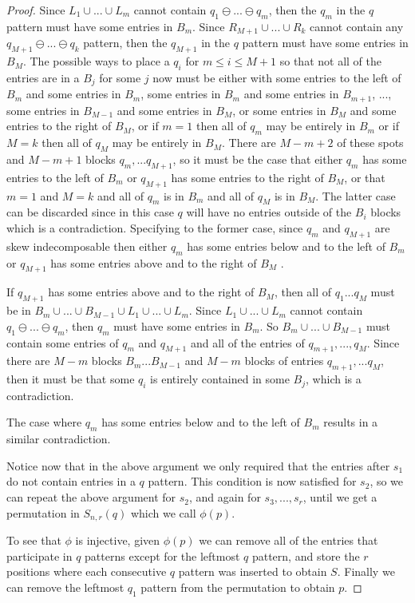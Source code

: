 \documentclass[10pt,a4paper]{amsart}
\begin{document}
\begin{proof}
    Since $L_1 \cup ... \cup L_m$ cannot contain $q_1 \ominus ... \ominus q_m$, then the $q_m$ in the $q$ pattern must have some entries in $B_m$. Since $R_{M+1} \cup ... \cup R_k$ cannot contain any $q_{M+1} \ominus ... \ominus q_k$ pattern, then the $q_{M+1}$ in the $q$ pattern must have some entries in $B_M$. The possible ways to place a $q_i$ for $m\leq i \leq M+1$ so that not all of the entries are in a $B_j$ for some $j$ now must be either with some entries to the left of $B_m$ and some entries in $B_m$, some entries in $B_m$ and some entries in $B_{m+1}$, ..., some entries in $B_{M-1}$ and some entries in $B_M$, or some entries in $B_M$ and some entries to the right of $B_M$, or if $m = 1$ then all of $q_m$ may be entirely in $B_m$ or if $M = k$ then all of $q_M$ may be entirely in $B_M$. There are $M-m + 2$ of these spots and $M-m + 1$ blocks $q_m, ... q_{M+1}$, so it must be the case that either $q_m$ has some entries to the left of $B_m$ or $q_{M+1}$ has some entries to the right of $B_M$, or that $m=1$ and $M=k$ and all of $q_m$ is in $B_m$ and all of $q_M$ is in $B_M$. The latter case can be discarded since in this case $q$ will have no entries outside of the $B_i$ blocks which is a contradiction. Specifying to the former case, since $q_m$ and $q_{M+1}$ are skew indecomposable then either $q_m$ has some entries below and to the left of $B_m$ or $q_{M+1}$ has some entries above and to the right of $B_M$ .
    
    If $q_{M+1}$ has some entries above and to the right of $B_M$, then all of $q_1 ... q_M$ must be in $B_m \cup ... \cup B_{M-1} \cup L_1 \cup ...\cup L_m$. Since $L_1 \cup ...\cup  L_m$ cannot contain $q_1 \ominus ... \ominus q_m$, then $q_m$ must have some entries in $B_m$. So $B_m \cup ... \cup B_{M-1}$ must contain some entries of $q_m$ and $q_{M+1}$ and all of the entries of $q_{m+1}, ..., q_M$. Since there are $M-m$ blocks $B_m ... B_{M-1}$ and $M-m$ blocks of entries $q_{m+1}, ... q_M$, then it must be that some $q_i$ is entirely contained in some $B_j$, which is a contradiction.

    The case where $q_m$ has some entries below and to the left of $B_m$ results in a similar contradiction.
    

    
    Notice now that in the above argument we only required that the entries after $s_1$ do not contain entries in a $q$ pattern. This condition is now satisfied for $s_2$, so we can repeat the above argument for $s_2$, and again for $s_3, ..., s_{r}$, until we get a permutation in $S_{n,r}(q)$ which we call $\phi(p)$.

    To see that $\phi$ is injective, given $\phi(p)$ we can remove all of the entries that participate in $q$ patterns except for the leftmost $q$ pattern, and store the $r$ positions where each consecutive $q$ pattern was inserted to obtain $S$. Finally we can remove the leftmost $q_1$ pattern from the permutation to obtain $p$.
\end{proof}
\end{document}
